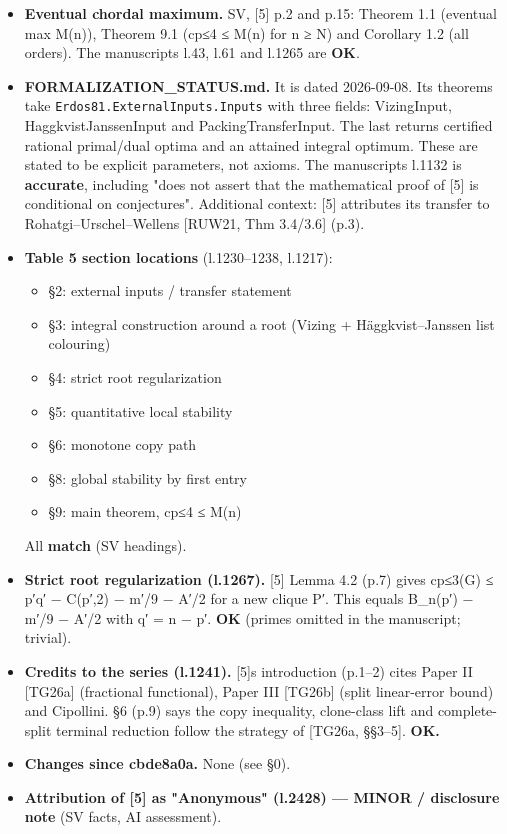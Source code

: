 \documentclass[
]{article}
\providecommand{\tightlist}{%
  \setlength{\itemsep}{0pt}\setlength{\parskip}{0pt}}
\begin{document}
\begin{itemize}
\item
  \textbf{Eventual chordal maximum.} SV, {[}5{]} p.2 and p.15: Theorem
  1.1 (eventual max M(n)), Theorem 9.1 (cp≤4 ≤ M(n) for n ≥ N) and
  Corollary 1.2 (all orders). The manuscript\textquotesingle s l.43,
  l.61 and l.1265 are \textbf{OK}.
\item
  \textbf{FORMALIZATION\_STATUS.md.} It is dated 2026-09-08. Its
  theorems take \texttt{Erdos81.ExternalInputs.Inputs} with three
  fields: VizingInput, HaggkvistJanssenInput and PackingTransferInput.
  The last returns certified rational primal/dual optima and an attained
  integral optimum. These are stated to be explicit parameters, not
  axioms. The manuscript\textquotesingle s l.1132 is \textbf{accurate},
  including "does not assert that the mathematical proof of {[}5{]} is
  conditional on conjectures". Additional context: {[}5{]} attributes
  its transfer to Rohatgi--Urschel--Wellens {[}RUW21, Thm 3.4/3.6{]}
  (p.3).
\item
  \textbf{Table 5 section locations} (l.1230--1238, l.1217):

  \begin{itemize}
  \tightlist
  \item
    §2: external inputs / transfer statement
  \item
    §3: integral construction around a root (Vizing + Häggkvist--Janssen
    list colouring)
  \item
    §4: strict root regularization
  \item
    §5: quantitative local stability
  \item
    §6: monotone copy path
  \item
    §8: global stability by first entry
  \item
    §9: main theorem, cp≤4 ≤ M(n)
  \end{itemize}

  All \textbf{match} (SV headings).
\item
  \textbf{Strict root regularization (l.1267).} {[}5{]} Lemma 4.2 (p.7)
  gives cp≤3(G) ≤ p′q′ − C(p′,2) − m′/9 − A′/2 for a new clique P′. This
  equals B\_n(p′) − m′/9 − A′/2 with q′ = n − p′. \textbf{OK} (primes
  omitted in the manuscript; trivial).
\item
  \textbf{Credits to the series (l.1241).} {[}5{]}\textquotesingle s
  introduction (p.1--2) cites Paper II {[}TG26a{]} (fractional
  functional), Paper III {[}TG26b{]} (split linear-error bound) and
  Cipollini. §6 (p.9) says the copy inequality, clone-class lift and
  complete-split terminal reduction follow the strategy of {[}TG26a,
  §§3--5{]}. \textbf{OK.}
\item
  \textbf{Changes since cbde8a0a.} None (see §0).
\item
  \textbf{Attribution of {[}5{]} as "Anonymous" (l.2428) --- MINOR /
  disclosure note} (SV facts, AI assessment).


\end{itemize}
\end{document}
